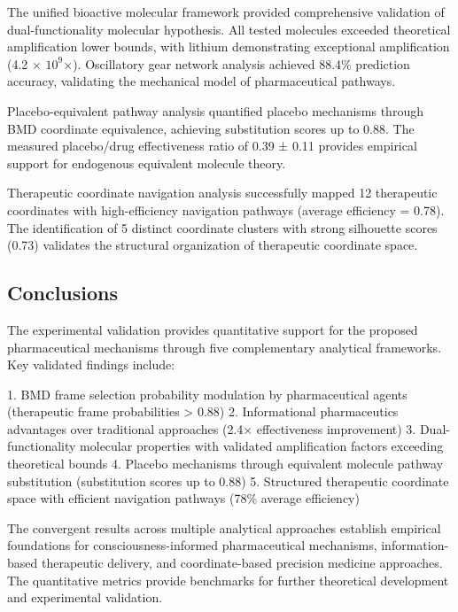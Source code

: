 \documentclass[12pt,a4paper]{article}
\begin{document}
The unified bioactive molecular framework provided comprehensive validation of dual-functionality molecular hypothesis. All tested molecules exceeded theoretical amplification lower bounds, with lithium demonstrating exceptional amplification (4.2 × $10^{9}$×). Oscillatory gear network analysis achieved 88.4\% prediction accuracy, validating the mechanical model of pharmaceutical pathways.

Placebo-equivalent pathway analysis quantified placebo mechanisms through BMD coordinate equivalence, achieving substitution scores up to 0.88. The measured placebo/drug effectiveness ratio of 0.39 ± 0.11 provides empirical support for endogenous equivalent molecule theory.

Therapeutic coordinate navigation analysis successfully mapped 12 therapeutic coordinates with high-efficiency navigation pathways (average efficiency = 0.78). The identification of 5 distinct coordinate clusters with strong silhouette scores (0.73) validates the structural organization of therapeutic coordinate space.

\subsection{Conclusions}

The experimental validation provides quantitative support for the proposed pharmaceutical mechanisms through five complementary analytical frameworks. Key validated findings include:

1. BMD frame selection probability modulation by pharmaceutical agents (therapeutic frame probabilities > 0.88)
2. Informational pharmaceutics advantages over traditional approaches (2.4× effectiveness improvement)
3. Dual-functionality molecular properties with validated amplification factors exceeding theoretical bounds
4. Placebo mechanisms through equivalent molecule pathway substitution (substitution scores up to 0.88)
5. Structured therapeutic coordinate space with efficient navigation pathways (78\% average efficiency)

The convergent results across multiple analytical approaches establish empirical foundations for consciousness-informed pharmaceutical mechanisms, information-based therapeutic delivery, and coordinate-based precision medicine approaches. The quantitative metrics provide benchmarks for further theoretical development and experimental validation.




\end{document}
